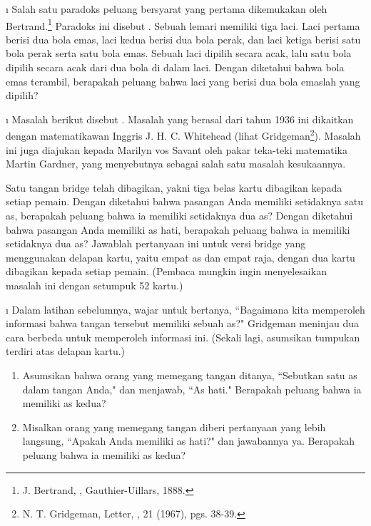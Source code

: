 \exercises
\begin{LJSItem}

\i\label{exer 4.3.1}
Salah satu paradoks peluang bersyarat yang pertama dikemukakan oleh
Bertrand.\footnote{J. Bertrand, ,
Gauthier-Uillars, 1888.}  Paradoks ini disebut .  Sebuah lemari memiliki tiga laci. Laci pertama berisi dua bola emas, laci
kedua berisi dua bola perak, dan laci ketiga berisi satu bola perak serta satu bola
emas. Sebuah laci dipilih secara acak, lalu satu bola dipilih secara acak dari dua
bola di dalam laci.  Dengan diketahui bahwa bola emas terambil, berapakah peluang
bahwa laci yang berisi dua bola emaslah yang dipilih?

\i\label{exer 4.3.2}
Masalah berikut disebut . Masalah yang
berasal dari tahun 1936 ini dikaitkan dengan matematikawan Inggris J. H. C.
Whitehead (lihat Gridgeman\footnote{N. T. 
Gridgeman, Letter, , 21 (1967), pgs. 38-39.}). Masalah ini juga
diajukan kepada Marilyn vos Savant oleh pakar teka-teki matematika Martin
Gardner, yang menyebutnya sebagai salah satu masalah kesukaannya.
\par
Satu tangan bridge telah dibagikan, yakni tiga belas kartu dibagikan
kepada setiap pemain.  Dengan diketahui bahwa pasangan Anda memiliki setidaknya satu
as, berapakah peluang bahwa ia memiliki setidaknya dua as?  Dengan diketahui bahwa
pasangan Anda memiliki as hati, berapakah peluang bahwa ia memiliki setidaknya dua as?
Jawablah pertanyaan ini untuk versi bridge yang menggunakan delapan kartu, yaitu empat
as dan empat raja, dengan dua kartu dibagikan kepada setiap pemain.  (Pembaca mungkin
ingin menyelesaikan masalah ini dengan setumpuk 52 kartu.)

\i\label{exer 4.3.3}
Dalam latihan sebelumnya, wajar untuk bertanya, ``Bagaimana kita memperoleh informasi
bahwa tangan tersebut memiliki sebuah as?" Gridgeman meninjau dua cara berbeda untuk
memperoleh informasi ini.  (Sekali lagi, asumsikan tumpukan terdiri atas delapan kartu.)
\begin{enumerate}
\item
Asumsikan bahwa orang yang memegang tangan ditanya, ``Sebutkan satu as dalam tangan
Anda," dan menjawab, ``As hati."  Berapakah peluang bahwa ia memiliki as kedua?
\item
Misalkan orang yang memegang tangan diberi pertanyaan yang lebih langsung, ``Apakah
Anda memiliki as hati?" dan jawabannya ya.  Berapakah peluang bahwa ia memiliki as kedua?
\end{enumerate}


\end{LJSItem}
